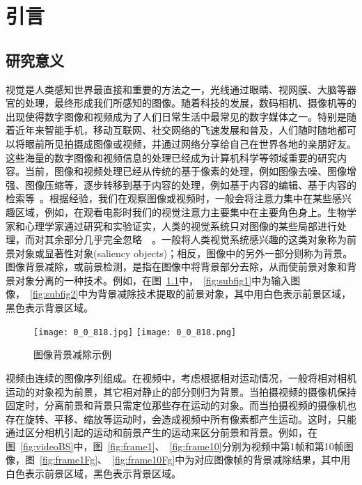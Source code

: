 \chapter{引言}
\label{cha:intro}

\section{研究意义}
\label{sec:first}
视觉是人类感知世界最直接和重要的方法之一，光线通过眼睛、视网膜、大脑等器官的处理，最终形成我们所感知的图像。随着科技的发展，数码相机、摄像机等的出现使得数字图像和视频成为了人们日常生活中最常见的数字媒体之一。特别是随着近年来智能手机，移动互联网、社交网络的飞速发展和普及，人们随时随地都可以将眼前所见拍摄成图像或视频，并通过网络分享给自己在世界各地的亲朋好友。这些海量的数字图像和视频信息的处理已经成为计算机科学等领域重要的研究内容。当前，图像和视频处理已经从传统的基于像素的处理，例如图像去噪、图像增强、图像压缩等，逐步转移到基于内容的处理，例如基于内容的编辑、基于内容的检索等~\cite{CMM12THU}。根据经验，我们在观察图像或视频时，一般会将注意力集中在某些感兴趣区域，例如，在观看电影时我们的视觉注意力主要集中在主要角色身上。生物学家和心理学家通过研究和实验证实，人类的视觉系统只对图像的某些局部进行处理，而对其余部分几乎完全忽略~\cite{treisman1980a}~\cite{Koch1985Shifts}。一般将人类视觉系统感兴趣的这类对象称为前景对象或显著性对象(saliency objects)；相反，图像中的另外一部分则称为背景。图像背景减除，或前景检测，是指在图像中将背景部分去除，从而使前景对象和背景对象分离的一种技术。例如，在图~\ref{fig:1}中，~\ref{fig:subfig1}中为输入图像，~\ref{fig:subfig2}中为背景减除技术提取的前景对象，其中用白色表示前景区域，黑色表示背景区域。\par
\begin{figure}[ht]
  \centering%
    {\texttt{[image: 0\_0\_818.jpg]}}%
 \hspace{1em}%
      {\texttt{[image: 0\_0\_818.png]}}
  \caption{图像背景减除示例}
  \label{fig:1}
\end{figure}
视频由连续的图像序列组成。在视频中，考虑根据相对运动情况，一般将相对相机运动的对象视为前景，其它相对静止的部分则归为背景。当拍摄视频的摄像机保持固定时，分离前景和背景只需定位那些存在运动的对象。而当拍摄视频的摄像机也存在旋转、平移、缩放等运动时，会造成视频中所有像素都产生运动。这时，只能通过区分相机引起的运动和前景产生的运动来区分前景和背景。例如，在图~\ref{fig:videoBS}中，图~\ref{fig:frame1}、~\ref{fig:frame10}分别为视频中第1帧和第10帧图像，图~\ref{fig:frame1Fg}、~\ref{fig:frame10Fg}中为对应图像帧的背景减除结果，其中用白色表示前景区域，黑色表示背景区域。
